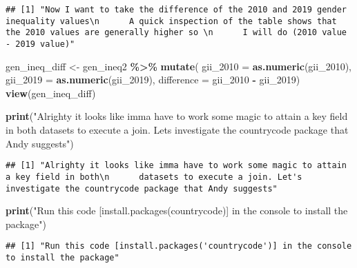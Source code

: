 \documentclass[
]{article}
\newenvironment{Shaded}{\begin{snugshade}}{\end{snugshade}}
\newcommand{\AttributeTok}[1]{\textcolor[rgb]{0.13,0.29,0.53}{#1}}
\newcommand{\FunctionTok}[1]{\textcolor[rgb]{0.13,0.29,0.53}{\textbf{#1}}}
\newcommand{\NormalTok}[1]{#1}
\newcommand{\OtherTok}[1]{\textcolor[rgb]{0.56,0.35,0.01}{#1}}
\newcommand{\SpecialCharTok}[1]{\textcolor[rgb]{0.81,0.36,0.00}{\textbf{#1}}}
\newcommand{\StringTok}[1]{\textcolor[rgb]{0.31,0.60,0.02}{#1}}
\begin{document}
\begin{verbatim}
## [1] "Now I want to take the difference of the 2010 and 2019 gender inequality values\n      A quick inspection of the table shows that the 2010 values are generally higher so \n      I will do (2010 value - 2019 value)"
\end{verbatim}

\begin{Shaded}
\begin{Highlighting}[]
\NormalTok{gen\_ineq\_diff }\OtherTok{\textless{}{-}}\NormalTok{ gen\_ineq2 }\SpecialCharTok{\%\textgreater{}\%}
  \FunctionTok{mutate}\NormalTok{(}
    \AttributeTok{gii\_2010 =} \FunctionTok{as.numeric}\NormalTok{(gii\_2010),}
    \AttributeTok{gii\_2019 =} \FunctionTok{as.numeric}\NormalTok{(gii\_2019),}
    \AttributeTok{difference =}\NormalTok{ gii\_2010 }\SpecialCharTok{{-}}\NormalTok{ gii\_2019)}
\FunctionTok{view}\NormalTok{(gen\_ineq\_diff)}
\end{Highlighting}
\end{Shaded}

\begin{Shaded}
\begin{Highlighting}[]
\FunctionTok{print}\NormalTok{(}\StringTok{"Alrighty it looks like imma have to work some magic to attain a key field in both}
\StringTok{      datasets to execute a join. Let\textquotesingle{}s investigate the countrycode package that Andy suggests"}\NormalTok{)}
\end{Highlighting}
\end{Shaded}

\begin{verbatim}
## [1] "Alrighty it looks like imma have to work some magic to attain a key field in both\n      datasets to execute a join. Let's investigate the countrycode package that Andy suggests"
\end{verbatim}

\begin{Shaded}
\begin{Highlighting}[]
\FunctionTok{print}\NormalTok{(}\StringTok{"Run this code [install.packages(\textquotesingle{}countrycode\textquotesingle{})] in the console to install the package"}\NormalTok{)}
\end{Highlighting}
\end{Shaded}

\begin{verbatim}
## [1] "Run this code [install.packages('countrycode')] in the console to install the package"
\end{verbatim}
\end{document}
